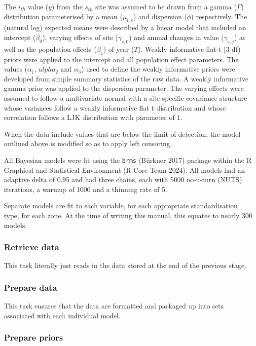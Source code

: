 \documentclass[
  8pt,
  a4paper]{article}
\begin{document}
The \(i_{th}\) value (\(y\)) from the \(s_{th}\) site was assumed to be
drawn from a gamma (\(\Gamma\)) distribution parameterised by a mean
(\(\mu_{i,s}\)) and dispersion (\(\phi\)) respectively. The (natural
log) expected means were described by a linear model that included an
intercept (\(\beta_0\)), varying effects of site (\(\gamma_{s,0}\)) and
annual changes in value (\(\gamma_{s,j}\)) as well as the population
effects (\(\beta_1\)) of year (\(T\)). Weakly informative flat-t (3 df)
priors were applied to the intercept and all population effect
parameters. The values (\(\alpha_1\), \(alpha_2\) and \(\alpha_3\)) used
to define the weakly informative priors were developed from simple
summary statistics of the raw data. A weakly informative gamma prior was
applied to the dispersion parameter. The varying effects were assumed to
follow a multivariate normal with a site-specific covariance structure
whose variances follow a weakly informative flat t distribution and
whose correlation follows a LJK distribution with parameter of 1.

When the data include values that are below the limit of detection, the
model outlined above is modified so as to apply left censoring.

All Bayesian models were fit using the \texttt{brms} (Bürkner 2017)
package within the R Graphical and Statistical Environment (R Core Team
2024). All models had an adaptive delta of 0.95 and had three chains,
each with 5000 no-u-turn (NUTS) iterations, a warmup of 1000 and a
thinning rate of 5.

Separate models are fit to each variable, for each appropriate
standardisation type, for each zone. At the time of writing this manual,
this equates to nearly 300 models.

\subsubsection{Retrieve data}\label{retrieve-data-1}

This task literally just reads in the data stored at the end of the
previous stage.

\subsubsection{Prepare data}\label{prepare-data}

This task ensures that the data are formatted and packaged up into sets
associated with each individual model.

\subsubsection{Prepare priors}\label{prepare-priors}
\end{document}
